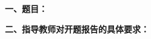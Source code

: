 {
    \setlength{\parindent}{0em}
    \par {\bfseries 一、题目：\uline{\hfill \Title \hfill}}
    \par {\bfseries 二、指导教师对开题报告的具体要求：}
}

\mbox{} \vfill

\signature{指导教师（签名）}
